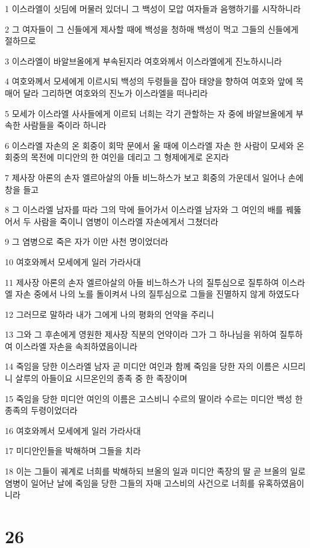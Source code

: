 \par 1 이스라엘이 싯딤에 머물러 있더니 그 백성이 모압 여자들과 음행하기를 시작하니라
\par 2 그 여자들이 그 신들에게 제사할 때에 백성을 청하매 백성이 먹고 그들의 신들에게 절하므로
\par 3 이스라엘이 바알브올에게 부속된지라 여호와께서 이스라엘에게 진노하시니라
\par 4 여호와께서 모세에게 이르시되 백성의 두령들을 잡아 태양을 향하여 여호와 앞에 목매어 달라 그리하면 여호와의 진노가 이스라엘을 떠나리라
\par 5 모세가 이스라엘 사사들에게 이르되 너희는 각기 관할하는 자 중에 바알브올에게 부속한 사람들을 죽이라 하니라
\par 6 이스라엘 자손의 온 회중이 회막 문에서 울 때에 이스라엘 자손 한 사람이 모세와 온 회중의 목전에 미디안의 한 여인을 데리고 그 형제에게로 온지라
\par 7 제사장 아론의 손자 엘르아살의 아들 비느하스가 보고 회중의 가운데서 일어나 손에 창을 들고
\par 8 그 이스라엘 남자를 따라 그의 막에 들어가서 이스라엘 남자와 그 여인의 배를 꿰뚫어서 두 사람을 죽이니 염병이 이스라엘 자손에게서 그쳤더라
\par 9 그 염병으로 죽은 자가 이만 사천 명이었더라
\par 10 여호와께서 모세에게 일러 가라사대
\par 11 제사장 아론의 손자 엘르아살의 아들 비느하스가 나의 질투심으로 질투하여 이스라엘 자손 중에서 나의 노를 돌이켜서 나의 질투심으로 그들을 진멸하지 않게 하였도다
\par 12 그러므로 말하라 내가 그에게 나의 평화의 언약을 주리니
\par 13 그와 그 후손에게 영원한 제사장 직분의 언약이라 그가 그 하나님을 위하여 질투하여 이스라엘 자손을 속죄하였음이니라
\par 14 죽임을 당한 이스라엘 남자 곧 미디안 여인과 함께 죽임을 당한 자의 이름은 시므리니 살루의 아들이요 시므온인의 종족 중 한 족장이며
\par 15 죽임을 당한 미디안 여인의 이름은 고스비니 수르의 딸이라 수르는 미디안 백성 한 종족의 두령이었더라
\par 16 여호와께서 모세에게 일러 가라사대
\par 17 미디안인들을 박해하며 그들을 치라
\par 18 이는 그들이 궤계로 너희를 박해하되 브올의 일과 미디안 족장의 딸 곧 브올의 일로 염병이 일어난 날에 죽임을 당한 그들의 자매 고스비의 사건으로 너희를 유혹하였음이니라

\chapter{26}

